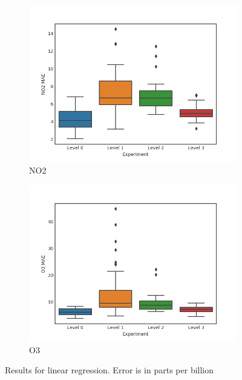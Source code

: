 \documentclass{article}
\begin{document}
\begin{figure}[H]
\centering
\begin{subfigure}{0.45\textwidth}
\includegraphics[width=\textwidth]{results/linear/no2.png}
\caption{NO2}
\end{subfigure}
\begin{subfigure}{0.45\textwidth}
\includegraphics[width=\textwidth]{results/linear/o3.png}
\caption{O3}
\end{subfigure}
\caption{Results for linear regression. Error is in parts per billion}
\label{fig:results-linear}
\end{figure}
\end{document}
